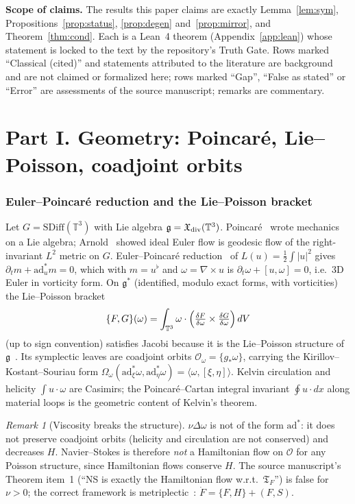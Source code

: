 \documentclass[11pt]{amsart}
\theoremstyle{definition}\newtheorem{definition}[theorem]{Definition}
\theoremstyle{remark}\newtheorem{remark}[theorem]{Remark}
\newcommand{\T}{\mathbb{T}^3}
\begin{document}
\noindent\textbf{Scope of claims.} The results this paper claims are exactly Lemma~\ref{lem:sym}, Propositions~\ref{prop:status},
\ref{prop:degen} and~\ref{prop:mirror}, and Theorem~\ref{thm:cond}. Each is a Lean~4 theorem (Appendix~\ref{app:lean}) whose
statement is locked to the text by the repository's Truth Gate. Rows marked ``Classical (cited)'' and statements
attributed to the literature are background and are not claimed or formalized here; rows marked ``Gap'', ``False as stated''
or ``Error'' are assessments of the source manuscript; remarks are commentary.

\part*{Part I. Geometry: Poincar\'e, Lie--Poisson, coadjoint orbits}

\section{Euler--Poincar\'e reduction and the Lie--Poisson bracket}
Let $G=\mathrm{SDiff}(\T)$ with Lie algebra $\mathfrak g=\mathfrak X_{\rm div}(\T)$. Poincar\'e~\cite{Poincare1901}
wrote mechanics on a Lie algebra; Arnold~\cite{Arnold1966} showed ideal Euler flow is geodesic flow
of the right-invariant $L^2$ metric on $G$. Euler--Poincar\'e reduction~\cite{HMR1998,MarsdenRatiu}
of $L(u)=\tfrac12\int|u|^2$ gives $\partial_t m+\mathrm{ad}^*_u m=0$, which with $m=u^\flat$ and
$\omega=\nabla\times u$ is $\partial_t\omega+[u,\omega]=0$, i.e.\ 3D Euler in vorticity form.
On $\mathfrak g^*$ (identified, modulo exact forms, with vorticities) the Lie--Poisson bracket
\[ \{F,G\}(\omega)=\int_{\T}\omega\cdot\Bigl(\tfrac{\delta F}{\delta\omega}\times\tfrac{\delta G}{\delta\omega}\Bigr)\,dV \]
(up to sign convention) satisfies Jacobi because it is the Lie--Poisson structure of $\mathfrak g$~\cite{MarsdenWeinstein1983}.
Its symplectic leaves are coadjoint orbits $\mathcal O_\omega=\{g_*\omega\}$, carrying the
Kirillov--Kostant--Souriau form $\Omega_\omega(\mathrm{ad}^*_\xi\omega,\mathrm{ad}^*_\eta\omega)=\langle\omega,[\xi,\eta]\rangle$.
Kelvin circulation and helicity $\int u\cdot\omega$ are Casimirs; the Poincar\'e--Cartan integral
invariant $\oint u\cdot dx$ along material loops is the geometric content of Kelvin's theorem.

\begin{remark}[Viscosity breaks the structure]
$\nu\Delta\omega$ is not of the form $\mathrm{ad}^*$: it does not preserve coadjoint orbits
(helicity and circulation are not conserved) and decreases $H$. Navier--Stokes is therefore
\emph{not} a Hamiltonian flow on $\mathcal O$ for any Poisson structure, since Hamiltonian flows conserve $H$.
The source manuscript's Theorem item~1 (``NS is exactly the Hamiltonian flow w.r.t.\ $\mathfrak T_F$'') is false
for $\nu>0$; the correct framework is metriplectic~\cite{Morrison1986}: $\dot F=\{F,H\}+(F,S)$.
\end{remark}
\end{document}

